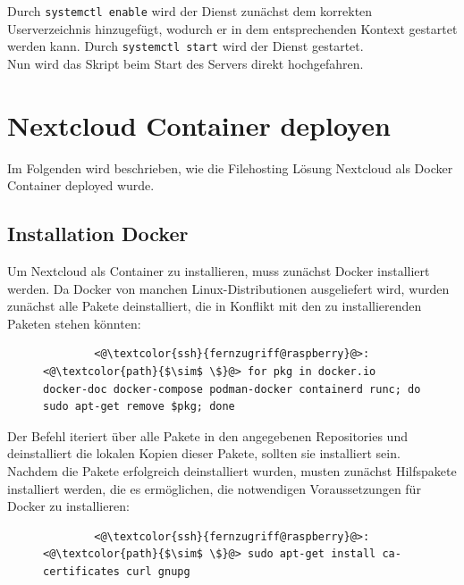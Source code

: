\documentclass[a4paper, 12pt]{scrartcl}
\begin{document}
Durch \lstinline[basicstyle={\small\ttfamily\color{black}}]|systemctl enable| wird der Dienst zunächst dem korrekten Userverzeichnis
hinzugefügt, wodurch er in dem entsprechenden Kontext gestartet werden kann. Durch
\lstinline[basicstyle={\small\ttfamily\color{black}}]|systemctl start| wird der Dienst gestartet.
\\
Nun wird das Skript beim Start des Servers direkt hochgefahren.


\section{Nextcloud Container deployen}
Im Folgenden wird beschrieben, wie die Filehosting Lösung Nextcloud als Docker Container deployed wurde.

\subsection{Installation Docker}
Um Nextcloud als Container zu installieren, muss zunächst Docker installiert werden. Da Docker von manchen Linux-Distributionen
ausgeliefert wird, wurden zunächst alle Pakete deinstalliert, die in Konflikt mit den zu installierenden Paketen stehen könnten:
\begin{figure}[H]
    \begin{mdframed}[backgroundcolor=bbg]
        \begin{lstlisting}
        <@\textcolor{ssh}{fernzugriff@raspberry}@>:<@\textcolor{path}{$\sim$ \$}@> for pkg in docker.io docker-doc docker-compose podman-docker containerd runc; do sudo apt-get remove $pkg; done
        \end{lstlisting}
    \end{mdframed}
    \label{lst:uninstall_docker_pkg}
\end{figure}
Der Befehl iteriert über alle Pakete in den angegebenen Repositories und deinstalliert die lokalen Kopien dieser Pakete, sollten
sie installiert sein.
\\
Nachdem die Pakete erfolgreich deinstalliert wurden, musten zunächst Hilfspakete installiert werden, die es ermöglichen, die
notwendigen Voraussetzungen für Docker zu installieren:
\begin{figure}[H]
    \begin{mdframed}[backgroundcolor=bbg]
        \begin{lstlisting}
        <@\textcolor{ssh}{fernzugriff@raspberry}@>:<@\textcolor{path}{$\sim$ \$}@> sudo apt-get install ca-certificates curl gnupg
        \end{lstlisting}
    \end{mdframed}
    \label{lst:install_https_pkgs}
\end{figure}
\end{document}
